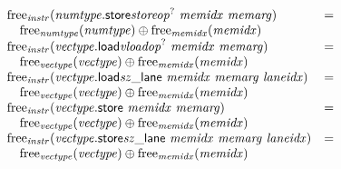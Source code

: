 $$\begin{array}[t]{@{}lcl@{}l@{}}
{\mathrm{free}}_{\mathit{instr}}({{\mathit{numtype}}{.}\mathsf{store}}{{{\mathit{storeop}}^?}}~{\mathit{memidx}}~{\mathit{memarg}}) & = & & \\
 \multicolumn{4}{@{}l@{}}{\quad
\begin{array}[t]{@{}l@{}}
{\mathrm{free}}_{\mathit{numtype}}({\mathit{numtype}}) \oplus {\mathrm{free}}_{\mathit{memidx}}({\mathit{memidx}}) \\
\end{array}
} \\
{\mathrm{free}}_{\mathit{instr}}({{\mathit{vectype}}{.}\mathsf{load}}{{{\mathit{vloadop}}^?}}~{\mathit{memidx}}~{\mathit{memarg}}) & = & & \\
 \multicolumn{4}{@{}l@{}}{\quad
\begin{array}[t]{@{}l@{}}
{\mathrm{free}}_{\mathit{vectype}}({\mathit{vectype}}) \oplus {\mathrm{free}}_{\mathit{memidx}}({\mathit{memidx}}) \\
\end{array}
} \\
{\mathrm{free}}_{\mathit{instr}}({{\mathit{vectype}}{.}\mathsf{load}}{{\mathit{sz}}}{\mathsf{\_}}{\mathsf{lane}}~{\mathit{memidx}}~{\mathit{memarg}}~{\mathit{laneidx}}) & = & & \\
 \multicolumn{4}{@{}l@{}}{\quad
\begin{array}[t]{@{}l@{}}
{\mathrm{free}}_{\mathit{vectype}}({\mathit{vectype}}) \oplus {\mathrm{free}}_{\mathit{memidx}}({\mathit{memidx}}) \\
\end{array}
} \\
{\mathrm{free}}_{\mathit{instr}}({\mathit{vectype}}{.}\mathsf{store}~{\mathit{memidx}}~{\mathit{memarg}}) & = & & \\
 \multicolumn{4}{@{}l@{}}{\quad
\begin{array}[t]{@{}l@{}}
{\mathrm{free}}_{\mathit{vectype}}({\mathit{vectype}}) \oplus {\mathrm{free}}_{\mathit{memidx}}({\mathit{memidx}}) \\
\end{array}
} \\
{\mathrm{free}}_{\mathit{instr}}({{\mathit{vectype}}{.}\mathsf{store}}{{\mathit{sz}}}{\mathsf{\_}}{\mathsf{lane}}~{\mathit{memidx}}~{\mathit{memarg}}~{\mathit{laneidx}}) & = & & \\
 \multicolumn{4}{@{}l@{}}{\quad
\begin{array}[t]{@{}l@{}}
{\mathrm{free}}_{\mathit{vectype}}({\mathit{vectype}}) \oplus {\mathrm{free}}_{\mathit{memidx}}({\mathit{memidx}}) \\

\end{array}}
\end{array}$$
